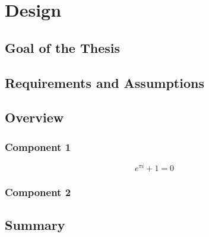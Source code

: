 
\chapter{Design}
\label{ch:design}

\section{Goal of the Thesis}

\section{Requirements and Assumptions}

\section{Overview}

\subsection{Component 1}


\begin{equation} \label{eu_eqn}
e^{\pi i} + 1 = 0
\end{equation}


\subsection{Component 2}

\section{Summary}